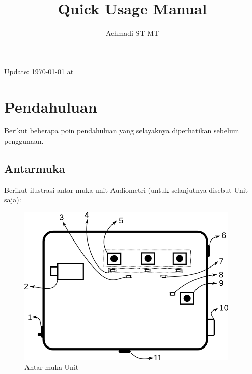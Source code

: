 \documentclass[12pt,]{article}
\title{\Large \bf
	Quick Usage Manual\\
}
\author{Achmadi ST MT}
\date{}
\begin{document}
	\maketitle
	\thispagestyle{empty}
	
	\vspace*{300pt}
	
	Update: {\today} at \currenttime \\
	
	
	\newpage
	\tableofcontents
	
	
	\newpage
	\section{Pendahuluan}
	
	Berikut beberapa poin pendahuluan yang selayaknya diperhatikan sebelum penggunaan.
	
	\subsection{Antarmuka}
	
	Berikut ilustrasi antar muka unit Audiometri (untuk selanjutnya disebut Unit saja):
	
	\begin{figure}[!ht]
		\centering
		\includegraphics[width=300pt]{images/part}
		\caption{Antar muka Unit}
	\end{figure}
\end{document}
